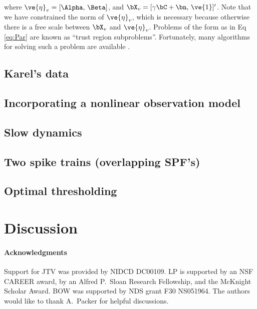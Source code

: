 \documentclass[12pt]{article}
\begin{document}
\noindent where $\ve{\eta}_v=[\Alpha, \, \Beta]$, and $\bX_v=[\gamma \bC + \bn, \, \ve{1}]'$. Note that we have constrained the norm of $\ve{\eta}_v$, which is necessary because otherwise there is a free scale between $\bX_v$ and $\ve{\eta}_v$.  Problems of the form as in Eq \eqref{eq:Par} are known as ``trust region subproblems''.  Fortunately, many algorithms for solving such a problem are available \cite{Fortin00}.  

\subsection{Karel's data}

\subsection{Incorporating a nonlinear observation model}

\subsection{Slow dynamics}

\subsection{Two spike trains (overlapping SPF's)}

\subsection{Optimal thresholding}

\section{Discussion}

\paragraph{Acknowledgments}

Support for JTV was provided by NIDCD DC00109. LP is supported by an NSF CAREER award, by an Alfred P.\ Sloan Research Fellowship, and the McKnight Scholar Award. BOW was supported by NDS grant F30 NS051964. The authors would like to thank A.\ Packer for helpful discussions.


%

%
%
\end{document}
